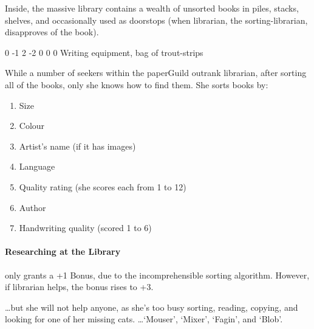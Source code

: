 \begin{multicols}{2}
Inside, the massive library contains a wealth of unsorted books in piles, stacks, shelves, and occasionally used as doorstops (when \gls{librarian}, the sorting-librarian, disapproves of the book).


{0}%
{-1}%
{{2}%
{-2}%
{0}}%
{0}%
{0}%
{}%
{Writing equipment, bag of trout-strips}%
{
  \setcounter{Academics}{3}
  \setcounter{Crafts}{1}
  \setcounter{Empathy}{1}
}

While a number of \glspl{seeker} within the \gls{paperGuild} outrank \gls{librarian}, after sorting all of the books, only she knows how to find them.
She sorts books by:

\begin{enumerate}
  \item
  Size
  \item
  Colour
  \item
  Artist's name (if it has images)
  \item
  Language
  \item
  Quality rating (she scores each from 1 to 12)
  \item
  Author
  \item
  Handwriting quality (scored 1 to 6)
\end{enumerate}

\paragraph{Researching at the Library}
only grants a +1 Bonus, due to the incomprehensible sorting algorithm.
However, if \gls{librarian} helps, the bonus rises to +3.

\ldots but she will not help anyone, as she's too busy sorting, reading, copying, and looking for one of her missing cats.%
\ldots{`Mouser', `Mixer', `Fagin', and `Blob'.}


\end{multicols}
